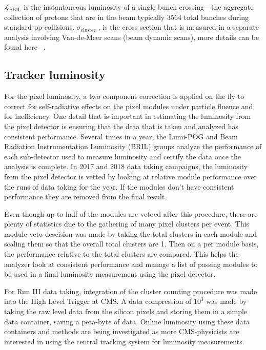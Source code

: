 $\mathcal{L}_{\text{SBIL}}$ is the instantaneous luminosity of a single bunch crossing---the aggregate collection of protons that are in the beam typically 3564 total bunches during standard pp-collisions. $\sigma_{\text{cluster}}$ , is the cross section that is measured in a separate analysis involving Van-de-Meer scans (beam dynamic scans), more details can be found here ~\cite{Knolle:2792593}. 


\subsection{Tracker luminosity}
For the pixel luminosity, a two component correction is applied on the fly to correct for self-radiative effects on the pixel modules under particle fluence and for inefficiency.  
One detail that is important in estimating the luminosity from the pixel detector is ensuring that the data that is taken and analyzed has consistent performance. Several times in a year, the Lumi-POG and Beam Radiation Instrumentation Luminosity (BRIL) groups analyze the performance of each sub-detector used to measure luminosity and certify the data once the analysis is complete. In 2017 and 2018 data taking campaigns, the luminosity from the pixel detector is vetted by looking at relative module performance over the runs of data taking for the year. If the modules don't have consistent performance they are removed from the final result. 

Even though up to half of the modules are vetoed after this procedure, there are plenty of statistics due to the gathering of many pixel clusters per event. 
This module veto descision was made by taking the total clusters in each module and scaling them so that the overall total clusters are 1. Then on a per module basis, the performance relative to the total clusters are compared. This helps the analyzer look at consistent performance and manage a list of passing modules to be used in a final luminosity measurement using the pixel detector. 

For Run III data taking, integration of the cluster counting procedure was made into the High Level Trigger at CMS. A data compression of $10^3$ was made by taking the raw level data from the silicon pixels and storing them in a simple data container, saving a peta-byte of data. Online luminosity using these data containers and methods are being investigated as more CMS-physicists are interested in using the central tracking system for luminosity measurements.

